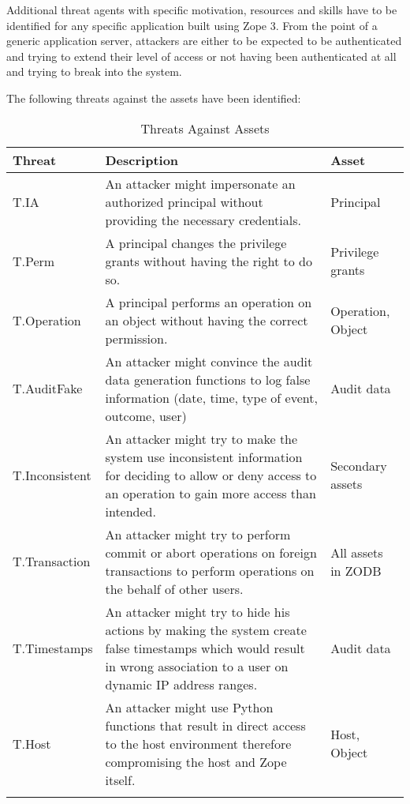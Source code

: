 \documentclass[12pt,english]{scrbook}
\begin{document}
Additional threat agents with specific motivation, resources and skills have to
be identified for any specific application built using Zope 3. From the point
of a generic application server, attackers are either to be expected to  be
authenticated and trying to extend their level of access or not having been
authenticated at all and trying to break into the system.

The following threats against the assets have been identified:

\begin{longtable}[c]{lp{6cm}p{4cm}}
  \toprule
  Threat & Description & Asset\\
  \midrule\endhead

  T.IA
   & 
  An attacker might impersonate an authorized
  principal without providing the necessary
  credentials.
   & 
  Principal
   \\

  T.Perm
   &
  A principal changes the privilege grants
  without having the right to do so.
   & 
  Privilege grants
   \\

  T.Operation
   & 
  A principal performs an operation on an object
  without having the correct permission.
   & 
  Operation, Object
   \\
  

  T.AuditFake
   & 
  An attacker might convince the audit data
  generation functions to log false information
  (date, time, type of event, outcome, user)
   & 
  Audit data
   \\
  

  T.Inconsistent
   & 
  An attacker might try to make the system use
  inconsistent information for deciding to allow
  or deny access to an operation to gain more
  access than intended.
   & 
  Secondary assets
   \\
  

  T.Transaction
   & 
  An attacker might try to perform commit or
  abort operations on foreign transactions to
  perform operations on the behalf of other
  users.
   & 
  All assets in ZODB
   \\

  T.Timestamps
   & 
  An attacker might try to hide his actions
  by making the system create false timestamps
  which would result in wrong association to a
  user on dynamic IP address ranges.
   & 
  Audit data
   \\

  T.Host
   & 
  An attacker might use Python functions that
  result in direct access to the host environment
  therefore compromising the host and Zope itself.
   & 
  Host, Object
  \\
  \bottomrule
\caption{Threats Against Assets}
\label{tab-threats}
\end{longtable}
  
\end{document}
